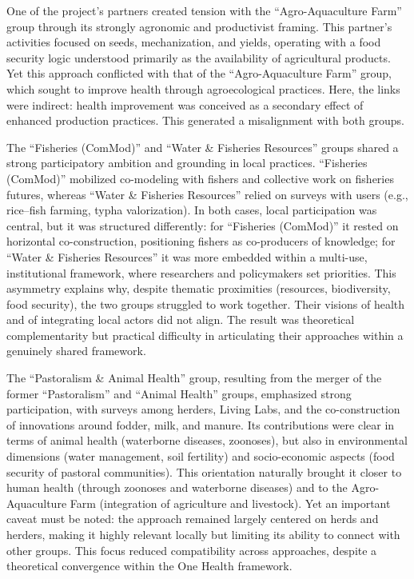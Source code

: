 \documentclass{article}
\begin{document}
One of the project’s partners created tension with the “Agro-Aquaculture Farm” group through its strongly agronomic and productivist framing. This partner’s activities focused on seeds, mechanization, and yields, operating with a food security logic understood primarily as the availability of agricultural products. Yet this approach conflicted with that of the “Agro-Aquaculture Farm” group, which sought to improve health through agroecological practices. Here, the links were indirect: health improvement was conceived as a secondary effect of enhanced production practices. This generated a misalignment with both groups.  

The “Fisheries (ComMod)” and “Water \& Fisheries Resources” groups shared a strong participatory ambition and grounding in local practices. “Fisheries (ComMod)” mobilized co-modeling with fishers and collective work on fisheries futures, whereas “Water \& Fisheries Resources” relied on surveys with users (e.g., rice–fish farming, typha valorization). In both cases, local participation was central, but it was structured differently: for “Fisheries (ComMod)” it rested on horizontal co-construction, positioning fishers as co-producers of knowledge; for “Water \& Fisheries Resources” it was more embedded within a multi-use, institutional framework, where researchers and policymakers set priorities. This asymmetry explains why, despite thematic proximities (resources, biodiversity, food security), the two groups struggled to work together. Their visions of health and of integrating local actors did not align. The result was theoretical complementarity but practical difficulty in articulating their approaches within a genuinely shared framework.  

The “Pastoralism \& Animal Health” group, resulting from the merger of the former “Pastoralism” and “Animal Health” groups, emphasized strong participation, with surveys among herders, Living Labs, and the co-construction of innovations around fodder, milk, and manure. Its contributions were clear in terms of animal health (waterborne diseases, zoonoses), but also in environmental dimensions (water management, soil fertility) and socio-economic aspects (food security of pastoral communities). This orientation naturally brought it closer to human health (through zoonoses and waterborne diseases) and to the Agro-Aquaculture Farm (integration of agriculture and livestock). Yet an important caveat must be noted: the approach remained largely centered on herds and herders, making it highly relevant locally but limiting its ability to connect with other groups. This focus reduced compatibility across approaches, despite a theoretical convergence within the One Health framework.  
\end{document}
